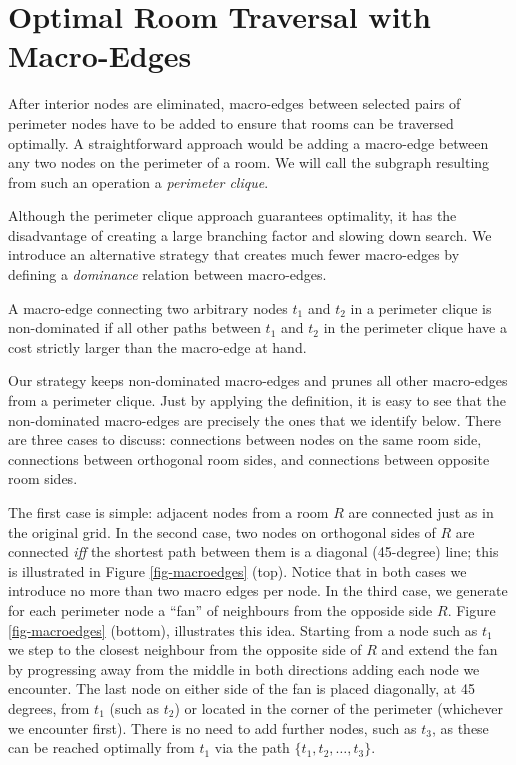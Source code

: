 \section{Optimal Room Traversal with Macro-Edges}

After interior nodes are eliminated, macro-edges between selected pairs of
perimeter nodes have to be added to ensure that rooms can be traversed
optimally.  A straightforward approach would be adding a macro-edge between any
two nodes on the perimeter of a room.  We will call the subgraph resulting from
such an operation a \emph{perimeter clique}.

Although the perimeter clique approach guarantees optimality, it has the
disadvantage of creating a large branching factor and slowing down search.  We
introduce an alternative strategy that creates much fewer macro-edges by
defining a \emph{dominance} relation between macro-edges.
%

\begin{definition}
A macro-edge connecting two arbitrary nodes $t_1$ and $t_2$ in a perimeter
clique is non-dominated if all other paths between $t_1$ and $t_2$ in the
perimeter clique have a cost strictly larger than the macro-edge at hand.
\end{definition}

Our strategy keeps non-dominated macro-edges and prunes all other macro-edges
from a perimeter clique.  Just by applying the definition, it is easy to see
that the non-dominated macro-edges are precisely the ones that we identify
below.  There are three cases to discuss: connections between nodes on the same
room side, connections between orthogonal room sides, and connections between
opposite room sides.

The first case is simple: adjacent nodes from a room $R$ are connected just as in the original
grid.  In the second case, two nodes on orthogonal sides of $R$ are
connected \emph{iff} the shortest path between them is a diagonal (45-degree)
line; this is illustrated in Figure \ref{fig-macroedges} (top).  Notice that in
both cases we introduce no more than two macro edges per node.  In the third
case, we generate for each perimeter node a ``fan'' of neighbours from the
opposide side $R$.  Figure \ref{fig-macroedges} (bottom), illustrates
this idea.  Starting from a node such as $t_{1}$ we step to the closest
neighbour from the opposite side of $R$ and extend the fan by progressing
away from the middle in both directions adding each node we encounter.  The last
node on either side of the fan is placed diagonally, at 45 degrees, from $t_{1}$
(such as $t_{2}$) or located in the corner of the perimeter (whichever we
encounter first).  There is no need to add further nodes, such as $t_{3}$, as
these can be reached optimally from $t_1$ via the path $\lbrace t_1, t_2, \dots,
t_3\rbrace$.

